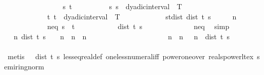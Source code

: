 \begin{isabellebody}
\ \ \ \ \ \ \isacommand{{\isacharbraceleft}{\kern0pt}}\isamarkupfalse%
\isanewline
\ \ \ \ \ \ \ \ \isamarkupfalse%
\ s\ t\isanewline
\ \ \ \ \ \ \ \ \isamarkupfalse%
\ s{\isacharcolon}{\kern0pt}\ {\isachardoublequoteopen}s\ {\isasymin}\ dyadic{\isacharunderscore}{\kern0pt}interval\ {}\ T{\isachardoublequoteclose}\isanewline
\ \ \ \ \ \ \ \ \ \ \ \ t{\isacharcolon}{\kern0pt}\ {\isachardoublequoteopen}t\ {\isasymin}\ dyadic{\isacharunderscore}{\kern0pt}interval\ {}\ T{\isachardoublequoteclose}\isanewline
\ \ \ \ \ \ \ \ \ \ \ \ st{\isacharunderscore}{\kern0pt}dist{\isacharcolon}{\kern0pt}\ {\isachardoublequoteopen}dist\ t\ s\ {\isasymle}\ {}\ {\isacharslash}{\kern0pt}\ {}\ {\isacharcircum}{\kern0pt}\ n\isanewline
\ \ \ \ \ \ \ \ \ \ \ \ neq{\isacharcolon}{\kern0pt}\ {\isachardoublequoteopen}s\ {\isasymnoteq}\ t{\isachardoublequoteclose}\isanewline
\ \ \ \ \ \ \ \ \isamarkupfalse%
\ \isamarkupfalse%
\ {\isachardoublequoteopen}dist\ t\ s\ {\isachargreater}{\kern0pt}\ {}{\isachardoublequoteclose}\isanewline
\ \ \ \ \ \ \ \ \ \ \isamarkupfalse%
\ neq\ \isamarkupfalse%
\ simp\isanewline
\ \ \ \ \ \ \ \ \isamarkupfalse%
\ \isamarkupfalse%
\ {\isachardoublequoteopen}{\isasymexists}n{\isachardot}{\kern0pt}\ dist\ t\ s\ {\isasymge}\ {}\ {\isacharslash}{\kern0pt}\ {}{\isacharcircum}{\kern0pt}n\ {\isasymand}\ n\ {\isasymge}\ n\isanewline
\ \ \ \ \ \ \ \ \isamarkupfalse%
\ {\isacharminus}{\kern0pt}\isanewline
\ \ \ \ \ \ \ \ \ \ \isamarkupfalse%
\ n\ \ n{\isacharcolon}{\kern0pt}\ {\isachardoublequoteopen}{}\ {\isacharslash}{\kern0pt}\ {}{\isacharcircum}{\kern0pt}n\ {\isasymle}\ dist\ t\ s{\isachardoublequoteclose}\isanewline
\ \ \ \ \ \ \ \ \ \ \ \ \isamarkupfalse%
\ {\isacharparenleft}{\kern0pt}metis\ {\isacartoucheopen}{}\ {\isacharless}{\kern0pt}\ dist\ t\ s{\isacartoucheclose}\ less{\isacharunderscore}{\kern0pt}eq{\isacharunderscore}{\kern0pt}real{\isacharunderscore}{\kern0pt}def\ one{\isacharunderscore}{\kern0pt}less{\isacharunderscore}{\kern0pt}numeral{\isacharunderscore}{\kern0pt}iff\ power{\isacharunderscore}{\kern0pt}one{\isacharunderscore}{\kern0pt}over\ reals{\isacharunderscore}{\kern0pt}power{\isacharunderscore}{\kern0pt}lt{\isacharunderscore}{\kern0pt}ex\ semiring{\isacharunderscore}{\kern0pt}norm{\isacharparenleft}{\kern0pt}{}{}{\isacharparenright}{\kern0pt}{\isacharparenright}{\kern0pt}\isanewline

\end{isabellebody}
